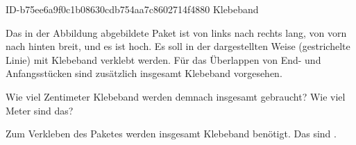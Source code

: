 \begin{exercise}
      {ID-b75ee6a9f0c1b08630cdb754aa7c8602714f4880}
      {Klebeband}
  \ifproblem\problem\par
    \begin{minipage}{0.33\linewidth}
    \end{minipage}\hfill
    \begin{minipage}{0.65\linewidth}
      Das in der Abbildung abgebildete Paket ist von links nach rechts 
      lang, von vorn nach hinten  breit, und es ist  hoch.
      Es soll in der dargestellten Weise (gestrichelte Linie) mit Klebeband
      verklebt werden. Für das Überlappen von End- und Anfangsstücken sind
      zusätzlich insgesamt  Klebeband vorgesehen.\par
      Wie viel Zentimeter Klebeband werden demnach insgesamt gebraucht?
      Wie viel Meter sind das?
    \end{minipage}
  \fi
  \ifoutcome\outcome\par
    Zum Verkleben des Paketes werden insgesamt  Klebeband benötigt.
    Das sind .
  \fi
\end{exercise}

